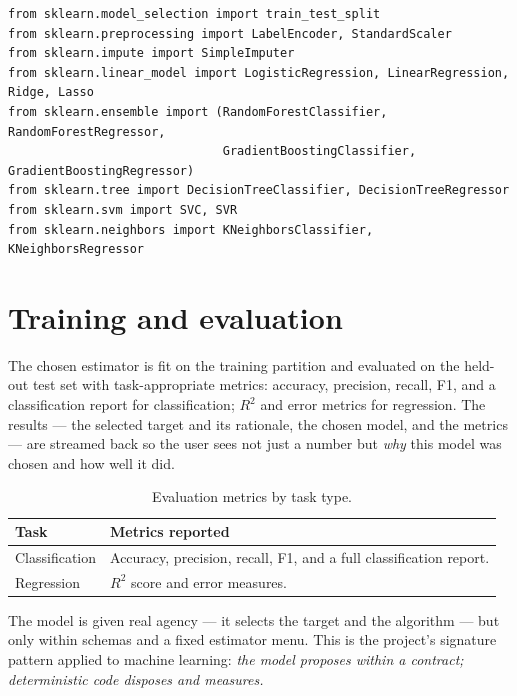 \begin{lstlisting}[style=py,caption={The scikit-learn building blocks used by the pipeline.}]
from sklearn.model_selection import train_test_split
from sklearn.preprocessing import LabelEncoder, StandardScaler
from sklearn.impute import SimpleImputer
from sklearn.linear_model import LogisticRegression, LinearRegression, Ridge, Lasso
from sklearn.ensemble import (RandomForestClassifier, RandomForestRegressor,
                              GradientBoostingClassifier, GradientBoostingRegressor)
from sklearn.tree import DecisionTreeClassifier, DecisionTreeRegressor
from sklearn.svm import SVC, SVR
from sklearn.neighbors import KNeighborsClassifier, KNeighborsRegressor
\end{lstlisting}

\section{Training and evaluation}
The chosen estimator is fit on the training partition and evaluated on the held-
out test set with task-appropriate metrics: accuracy, precision, recall, F1, and
a classification report for classification; $R^2$ and error metrics for
regression. The results --- the selected target and its rationale, the chosen
model, and the metrics --- are streamed back so the user sees not just a number
but \emph{why} this model was chosen and how well it did.

\begin{table}[h]
\centering
\caption{Evaluation metrics by task type.}
\small
\begin{tabularx}{\linewidth}{@{}L{3.0cm} X@{}}
\toprule
\textbf{Task} & \textbf{Metrics reported} \\
\midrule
Classification & Accuracy, precision, recall, F1, and a full classification
report. \\
Regression & $R^2$ score and error measures. \\
\bottomrule
\end{tabularx}
\end{table}

\begin{uanote}
The model is given real agency --- it selects the target and the algorithm ---
but only within schemas and a fixed estimator menu. This is the project's
signature pattern applied to machine learning: \emph{the model proposes within a
contract; deterministic code disposes and measures.}
\end{uanote}
